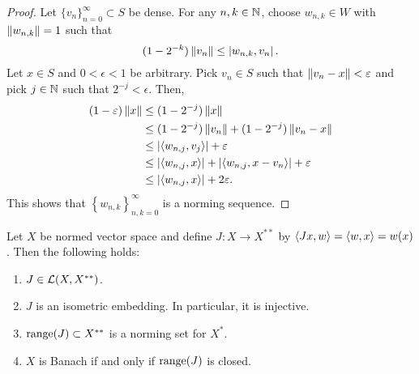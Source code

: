 \documentclass[a4paper]{article}
\renewcommand{\seqinfn}[1]{\{ #1 \}_{n=0}^\infty}
\begin{document}
\begin{proof}

Let $\seqinfn{v_n} \subset S$ be dense.
For any $n, k \in \mathbb{N}$, choose $w_{n, k} \in W$ with
$\left\lVert w_{n, k}\right\rVert = 1$ such that
\[
(1 - 2^{-k}) \left\lVert v_n\right\rVert \leq \left\lvert w_{n, k}, v_n\right\rvert.
\]
Let $x \in S$ and $0 < \epsilon < 1$ be arbitrary.
Pick $v_n \in S$ such that $\left\lVert v_n - x\right\rVert < \varepsilon$ and
pick $j \in \mathbb{N}$ such that $2^{-j} < \epsilon$. Then,
\[
\begin{aligned}
(1 - \varepsilon) \left\lVert x\right\rVert
&\leq (1 - 2^{-j}) \left\lVert x\right\rVert  \\
&\leq (1 - 2^{-j}) \left\lVert v_n\right\rVert + (1 - 2^{-j}) \left\lVert v_n - x\right\rVert \\
&\leq \left\lvert \left\langle w_{n, j}, v_j \right\rangle\right\rvert + \varepsilon \\
&\leq \left\lvert \left\langle w_{n, j}, x \right\rangle\right\rvert + \left\lvert \left\langle w_{n, j},
x - v_n \right\rangle\right\rvert + \varepsilon \\
&\leq \left\lvert \left\langle w_{n, j}, x \right\rangle\right\rvert + 2 \varepsilon.
\end{aligned}
\]
This shows that $\left\{ w_{n, k} \right\}_{n, k = 0}^\infty$
is a norming sequence.

\end{proof}

\begin{thm}
Let $X$ be normed vector space and define $J: X \to X^{**}$
by $\left\langle Jx, w \right\rangle = \left\langle w, x \right\rangle = w(x)$. Then the following
holds:
\begin{enumerate}
\item $J \in \mathcal{L}(X, X^{**})$.
\item $J$ is an isometric embedding. In particular, it is
injective.
\item $\operatorname{range}(J) \subset X^{**}$ is a norming set for $X^*$.
\item $X$ is Banach if and only if $\operatorname{range}(J)$ is closed.
\end{enumerate}
\end{thm}
\end{document}
